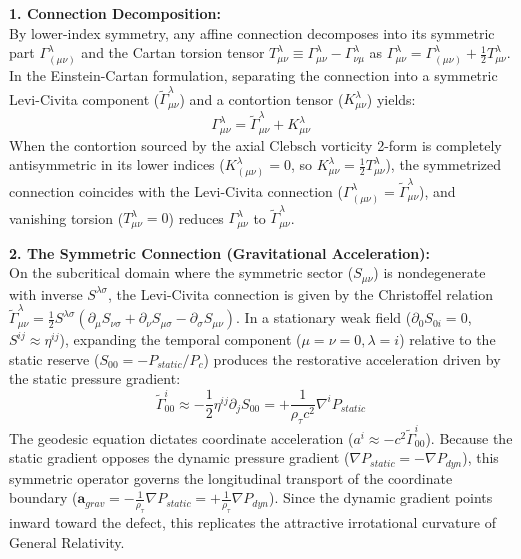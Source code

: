 \textbf{1. Connection Decomposition:} \\
By lower-index symmetry, any affine connection decomposes into its symmetric part $\Gamma^\lambda_{(\mu\nu)}$ and the Cartan torsion tensor $T^\lambda_{\mu\nu} \equiv \Gamma^\lambda_{\mu\nu} - \Gamma^\lambda_{\nu\mu}$ as $\Gamma^\lambda_{\mu\nu} = \Gamma^\lambda_{(\mu\nu)} + \frac{1}{2}T^\lambda_{\mu\nu}$. In the Einstein-Cartan formulation, separating the connection into a symmetric Levi-Civita component ($\tilde{\Gamma}^\lambda_{\mu\nu}$) and a contortion tensor ($K^\lambda_{\mu\nu}$) yields: %
\begin{equation}
    \Gamma^\lambda_{\mu\nu} = \tilde{\Gamma}^\lambda_{\mu\nu} + K^\lambda_{\mu\nu}
\end{equation}
When the contortion sourced by the axial Clebsch vorticity 2-form is completely antisymmetric in its lower indices ($K^\lambda_{(\mu\nu)} = 0$, so $K^\lambda_{\mu\nu} = \frac{1}{2}T^\lambda_{\mu\nu}$), the symmetrized connection coincides with the Levi-Civita connection ($\Gamma^\lambda_{(\mu\nu)} = \tilde{\Gamma}^\lambda_{\mu\nu}$), and vanishing torsion ($T^\lambda_{\mu\nu} = 0$) reduces $\Gamma^\lambda_{\mu\nu}$ to $\tilde{\Gamma}^\lambda_{\mu\nu}$.

\vspace{0.2 cm}

\textbf{2. The Symmetric Connection (Gravitational Acceleration):} \\
On the subcritical domain where the symmetric sector ($S_{\mu\nu}$) is nondegenerate with inverse $S^{\lambda\sigma}$, the Levi-Civita connection is given by the Christoffel relation $\tilde{\Gamma}^\lambda_{\mu\nu} = \frac{1}{2}S^{\lambda\sigma}(\partial_\mu S_{\nu\sigma} + \partial_\nu S_{\mu\sigma} - \partial_\sigma S_{\mu\nu})$. In a stationary weak field ($\partial_0 S_{0i} = 0$, $S^{ij} \approx \eta^{ij}$), expanding the temporal component ($\mu = \nu = 0, \lambda = i$) relative to the static reserve ($S_{00} = -P_{static}/P_c$) produces the restorative acceleration driven by the static pressure gradient: %
\begin{equation}
    \tilde{\Gamma}^i_{00} \approx -\frac{1}{2} \eta^{ij} \partial_j S_{00} = +\frac{1}{\rho_\tau c^2} \nabla^i P_{static} 
\end{equation}
The geodesic equation dictates coordinate acceleration ($a^i \approx -c^2 \tilde{\Gamma}^i_{00}$). Because the static gradient opposes the dynamic pressure gradient ($\nabla P_{static} = -\nabla P_{dyn}$), this symmetric operator governs the longitudinal transport of the coordinate boundary ($\mathbf{a}_{grav} = -\frac{1}{\rho_\tau} \nabla P_{static} = +\frac{1}{\rho_\tau} \nabla P_{dyn}$). Since the dynamic gradient points inward toward the defect, this replicates the attractive irrotational curvature of General Relativity. 


